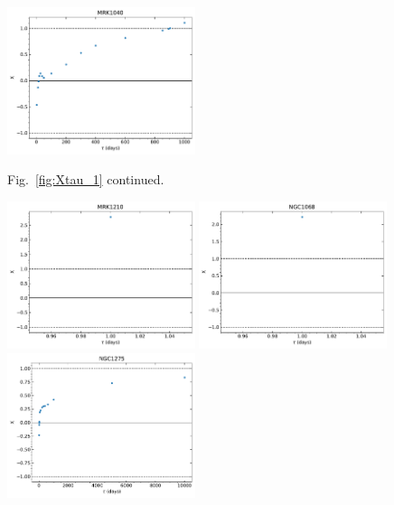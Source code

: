 \begin{figure}
\begin{center}
{  \includegraphics[width=0.49\textwidth]{Figs/Chapter5/X_tau/X_tau_MRK1040.pdf} \\
  \caption{Fig.~\ref{fig:Xtau_1} continued.}
    \label{fig:Xtau_3}
  }
\end{center}
\end{figure}

\begin{figure}
\begin{center}
    {
  \includegraphics[width=0.49\textwidth]{Figs/Chapter5/X_tau/X_tau_MRK1210.pdf} \hfill
  \includegraphics[width=0.49\textwidth]{Figs/Chapter5/X_tau/X_tau_NGC1068.pdf} \\
  \includegraphics[width=0.49\textwidth]{Figs/Chapter5/X_tau/X_tau_NGC1275.pdf} \hfill 
}
\end{center}
\end{figure}
